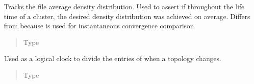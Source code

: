 \documentclass[letterpaper,10pt,english]{sphinxmanual}
\begin{document}
\begin{fulllineitems}
\begin{fulllineitems}
\end{fulllineitems}


\begin{fulllineitems}
\label{\detokenize{app.domain:app.domain.cluster_groups.SGCluster.avg_}}
Tracks the file average density distribution. Used to assert if
throughout the life time of a cluster, the desired density
distribution {\hyperref[\detokenize{app.domain:app.domain.cluster_groups.SGCluster.v_}]{}} was achieved on average. Differs from
{\hyperref[\detokenize{app.domain:app.domain.cluster_groups.SGCluster.cv_}]{}} because  is used for instantaneous
convergence comparison.
\begin{quote}\begin{description}
\item[{Type}] \leavevmode
{}

\end{description}\end{quote}

\end{fulllineitems}


\begin{fulllineitems}
\label{\detokenize{app.domain:app.domain.cluster_groups.SGCluster._timer}}
Used as a logical clock to divide the entries of {\hyperref[\detokenize{app.domain:app.domain.cluster_groups.SGCluster.avg_}]{}}
when a topology changes.
\begin{quote}\begin{description}
\item[{Type}] \leavevmode
{}

\end{description}\end{quote}

\end{fulllineitems}


\end{fulllineitems}
\end{document}
